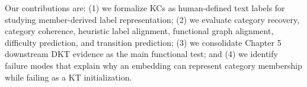 Our contributions are:
(1) we formalize KCs as human-defined text labels for studying member-derived label representation;
(2) we evaluate category recovery, category coherence, heuristic label alignment, functional graph alignment, difficulty prediction, and transition prediction;
(3) we consolidate Chapter 5 downstream DKT evidence as the main functional test; and
(4) we identify failure modes that explain why an embedding can represent category membership while failing as a KT initialization.
